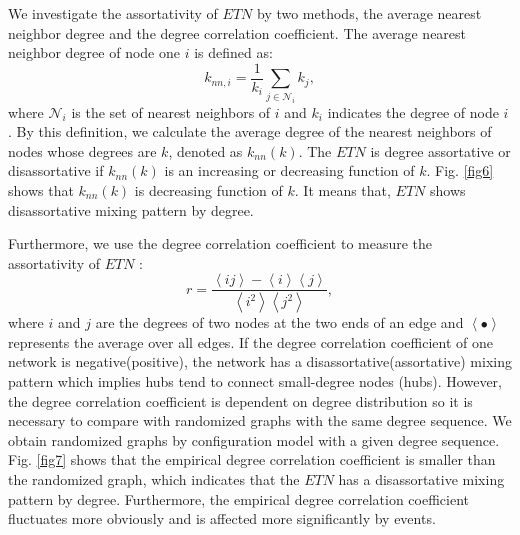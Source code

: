 \documentclass[conference]{IEEEtran}
\begin{document}
\begin{CJK*}{UTF8}{gbsn}
We investigate the assortativity of $ETN$ by two methods, the average nearest neighbor degree and the degree correlation coefficient. The average nearest neighbor degree of node one $i$ is defined as\cite{pastor2001dynamical}:
\begin{equation}
k_{nn,i} = \frac{1}{k_i}\sum_{j \in \mathcal{N}_{i}} k_j ,
\end{equation}
where $\mathcal{N}_{i}$ is the set of nearest neighbors of $i$ and $k_i$ indicates the degree of node $i$. By this definition, we calculate the average degree of the nearest neighbors of nodes whose degrees are $k$, denoted as $k_{nn}(k)$. The $ETN$ is degree assortative or disassortative if  $k_{nn}(k)$ is an increasing or decreasing function of $k$. Fig. \ref{fig6} shows that $ k_{nn}(k)$ is decreasing function of $k$. It means that, $ETN$ shows disassortative mixing pattern by degree.

Furthermore, we use the degree correlation coefficient to measure the assortativity of $ETN$ \cite{newman2002assortative}:
\begin{equation}
r=\frac{\left\langle ij \right\rangle - \left\langle i \right\rangle \left\langle j \right\rangle}{\left\langle i^2 \right\rangle \left\langle j^2 \right\rangle},
\end{equation}
where $i$ and $j$ are the degrees of two nodes at the two ends of an edge and $ \left\langle \bullet \right\rangle $ represents the average over all edges. If the degree correlation coefficient of one network is negative(positive), the network has a disassortative(assortative) mixing pattern which implies hubs tend to connect small-degree nodes (hubs). However, the degree correlation coefficient is dependent on degree distribution\cite{zhou2007structural} so it is necessary to compare with randomized graphs with the same degree sequence. We obtain randomized graphs by configuration model with a given degree sequence\cite{newman2003structure}. Fig. \ref{fig7} shows that the empirical degree correlation coefficient is smaller than the randomized graph, which indicates that the $ETN$ has a disassortative mixing pattern by degree. Furthermore, the empirical degree correlation coefficient fluctuates more obviously and is affected more significantly by events.



\end{CJK*}
\end{document}
